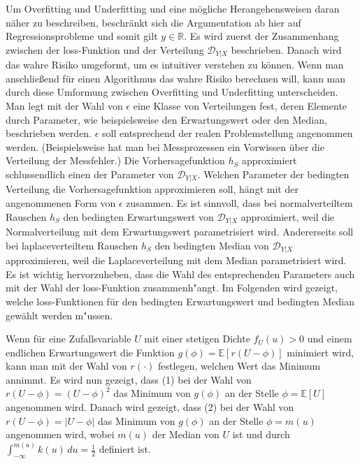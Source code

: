 Um Overfitting und Underfitting und eine m\"ogliche Herangehensweisen daran n\"aher zu beschreiben, beschr\"ankt sich die Argumentation ab hier auf Regressionsprobleme und somit gilt
$y \in \mathbb{R}$. Es wird zuerst der Zusammenhang zwischen der loss-Funktion und der Verteilung $\mathcal{D}_{Y|X}$ beschrieben. Danach
wird das wahre Risiko umgeformt, um es intuitiver verstehen zu k\"onnen. Wenn man anschlie{\ss}end f\"ur einen Algorithmus das wahre Risiko berechnen will,
kann man durch diese Umformung zwischen Overfitting und Underfitting unterscheiden. \\


Man legt mit der Wahl von $\epsilon$ eine Klasse von Verteilungen fest, deren Elemente durch Parameter, wie beispielsweise den Erwartungswert oder den Median,
beschrieben werden. $\epsilon$ soll entsprechend der realen Problemstellung angenommen werden.
(Beispielsweise hat man bei Messprozessen ein Vorwissen \"uber die Verteilung der Messfehler.)
Die Vorhersagefunktion $h_S$ approximiert schlussendlich einen
der Parameter von $\mathcal{D}_{Y|X}$. Welchen Parameter der bedingten Verteilung die Vorhersagefunktion approximieren soll, h\"angt
mit der angenommenen Form von $\epsilon$ zusammen. Es ist sinnvoll, dass bei normalverteiltem Rauschen
$h_S$ den bedingten Erwartungswert von $\mathcal{D}_{Y|X}$ approximiert, weil die Normalverteilung mit dem Erwartungswert parametrisiert wird.
Andererseits soll bei laplaceverteiltem Rauschen $h_S$ den bedingten Median von $\mathcal{D}_{Y|X}$ approximieren, weil die
Laplaceverteilung mit dem Median parametrisiert wird. \\


Es ist wichtig hervorzuheben, dass die Wahl des entsprechenden Parameters auch mit der Wahl der loss-Funktion zusammenh"angt.
Im Folgenden wird gezeigt, welche loss-Funktionen f\"ur den bedingten Erwartungswert und bedingten Median gew\"ahlt werden m"ussen.


Wenn f\"ur eine Zufallsvariable $U$ mit einer stetigen Dichte $f_U(u) > 0$ und einem endlichen Erwartungswert die Funktion $g(\phi) = \mathbb{E}[r(U - \phi)]$ minimiert wird,
kann man mit der Wahl von $r(\cdot)$
festlegen, welchen Wert das Minimum annimmt. Es wird nun gezeigt, dass (1) bei der Wahl von $r(U - \phi) = (U - \phi)^2$ das Minimum von $g(\phi)$ an der Stelle
$\phi = \mathbb{E}[U]$ angenommen wird. Danach wird gezeigt, dass (2) bei der Wahl von $r(U - \phi) = |U - \phi|$ das Minimum von $g(\phi)$ an der Stelle
$\phi = m(u)$ angenommen wird, wobei $m(u)$ der Median von $U$ ist und durch $\int_{-\infty}^{m(u)} k(u) \, du = \frac{1}{2}$ definiert ist.


